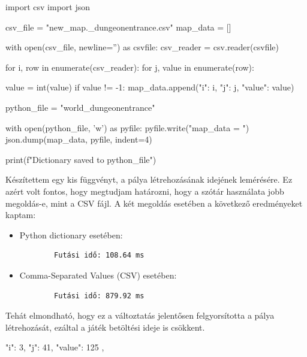 \begin{python}[caption={CSV formátum dictionary formátumra konvertálása},label=py:csvtodict]
    import csv
    import json
    
    csv_file = "new_map\MSmap._dungeonentrance.csv"
    map_data = []
    
    with open(csv_file, newline='') as csvfile:
        csv_reader = csv.reader(csvfile)
    
        for i, row in enumerate(csv_reader):
            for j, value in enumerate(row):
    
                value = int(value)
                if value != -1:
                    map_data.append({"i": i, "j": j, "value": value})
    
    python_file = "world_dungeonentrance"
    
    with open(python_file, 'w') as pyfile:
        pyfile.write("map_data = ")
        json.dump(map_data, pyfile, indent=4)
    
    print(f"Dictionary saved to {python_file}")
    
\end{python}


Készítettem egy kis függvényt, a pálya létrehozásának idejének lemérésére. Ez azért volt fontos, hogy megtudjam határozni, hogy a szótár használata jobb megoldás-e, mint a CSV fájl. A két megoldás esetében a következő eredményeket kaptam:

\begin{itemize}
    
    \item Python dictionary esetében:
    \begin{verbatim}
        Futási idő: 108.64 ms
    \end{verbatim}
    \item Comma-Separated Values (CSV) esetében:
    \begin{verbatim}
        Futási idő: 879.92 ms
    \end{verbatim}
\end{itemize}
    
\indent \indent Tehát elmondható, hogy ez a változtatás jelentősen felgyorsította a pálya létrehozását, ezáltal a játék betöltési ideje is csökkent.



\begin{python}[caption={Minta az átalakított struktúrára
    }, label=py:átalakított struktúra]
    {
        "i": 3,
        "j": 41,
        "value": 125
    },
\end{python}

